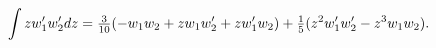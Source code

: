 \[\int zw^{\prime}_{1}w^{\prime}_{2}dz=\tfrac{3}{10}(-w_{1}w_{2}+zw_{1}w^{\prime%
}_{2}+zw^{\prime}_{1}w_{2})+\tfrac{1}{5}(z^{2}w^{\prime}_{1}w^{\prime}_{2}-z^{%
3}w_{1}w_{2}).\]